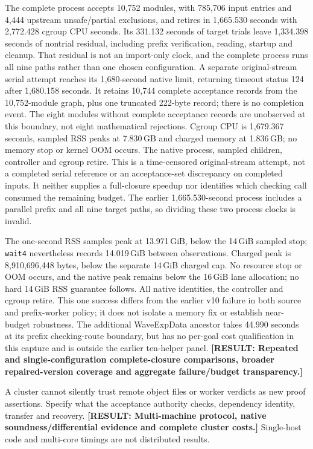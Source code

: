 \documentclass[10pt,twocolumn]{article}
\newcommand{\missing}[1]{\textbf{[RESULT: #1]}}
\begin{document}
The complete process accepts 10,752 modules, with 785,706 input entries and
4,444 upstream unsafe/partial exclusions, and retires in 1,665.530 seconds
with 2,772.428 cgroup CPU seconds.
Its 331.132 seconds of target trials leave 1,334.398 seconds of nontrial
residual, including prefix verification, reading, startup and cleanup.
That residual is not an import-only clock, and the complete process runs
all nine paths rather than one chosen configuration.
A separate original-stream serial attempt reaches its 1,680-second
native limit, returning timeout status 124 after 1,680.158 seconds.
It retains 10,744 complete acceptance records from the 10,752-module graph,
plus one truncated 222-byte record; there is no completion event.
The eight modules without complete acceptance records are unobserved at
this boundary, not eight mathematical rejections.
Cgroup CPU is 1,679.367 seconds, sampled RSS peaks at 7.830\,GB and charged
memory at 1.836\,GB; no memory stop or kernel OOM occurs.
The native process, sampled children, controller and cgroup retire.
This is a time-censored original-stream attempt, not a completed serial
reference or an acceptance-set discrepancy on completed inputs.
It neither supplies a full-closure speedup nor identifies which checking
call consumed the remaining budget.
The earlier 1,665.530-second process includes a parallel prefix and all
nine target paths, so dividing these two process clocks is invalid.

The one-second RSS samples peak at 13.971\,GiB, below the 14\,GiB sampled
stop; \texttt{wait4} nevertheless records 14.019\,GiB between observations.
Charged peak is 8,910,696,448 bytes, below the separate 14\,GiB charged cap.
No resource stop or OOM occurs, and the native peak remains below the
16\,GiB lane allocation; no hard 14\,GiB RSS guarantee follows.
All native identities, the controller and cgroup retire.
This one success differs from the earlier v10 failure in both source and
prefix-worker policy; it does not isolate a memory fix or establish
near-budget robustness.
The additional WaveExpData ancestor takes 44.990 seconds at its prefix
checking-route boundary, but has no per-goal cost qualification in this
capture and is outside the earlier ten-helper panel.
\missing{Repeated and single-configuration complete-closure comparisons,
broader repaired-version coverage and aggregate failure/budget transparency.}

A cluster cannot silently trust remote object files or worker verdicts as
new proof assertions. Specify what the acceptance authority checks,
dependency identity, transfer and recovery.
\missing{Multi-machine protocol, native soundness/differential evidence
and complete cluster costs.}
Single-host code and multi-core timings are not distributed results.
\end{document}
